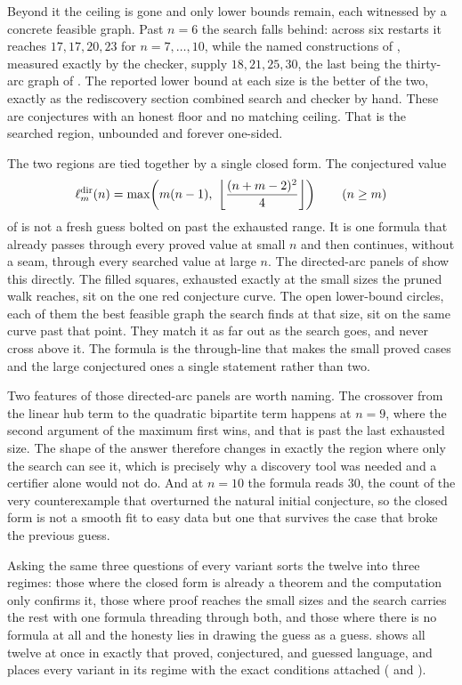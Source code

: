 Beyond it the ceiling is gone and only lower bounds remain, each witnessed by a concrete feasible graph. Past $n = 6$ the search falls behind: across six restarts it reaches $17, 17, 20, 23$ for $n = 7, \dots, 10$, while the named constructions of , measured exactly by the checker, supply $18, 21, 25, 30$, the last being the thirty-arc graph of . The reported lower bound at each size is the better of the two, exactly as the rediscovery section combined search and checker by hand. These are conjectures with an honest floor and no matching ceiling. That is the searched region, unbounded and forever one-sided.

The two regions are tied together by a single closed form. The conjectured value
\[
    \ell_m^{\mathrm{dir}}(n) = \max\!\left(m(n-1),\ \left\lfloor \frac{(n+m-2)^2}{4} \right\rfloor\right)
    \qquad (n \ge m)
\]
of  is not a fresh guess bolted on past the exhausted range. It is one formula that already passes through every proved value at small $n$ and then continues, without a seam, through every searched value at large $n$. The directed-arc panels of  show this directly. The filled squares, exhausted exactly at the small sizes the pruned walk reaches, sit on the one red conjecture curve. The open lower-bound circles, each of them the best feasible graph the search finds at that size, sit on the same curve past that point. They match it as far out as the search goes, and never cross above it. The formula is the through-line that makes the small proved cases and the large conjectured ones a single statement rather than two.

Two features of those directed-arc panels are worth naming. The crossover from the linear hub term to the quadratic bipartite term happens at $n = 9$, where the second argument of the maximum first wins, and that is past the last exhausted size. The shape of the answer therefore changes in exactly the region where only the search can see it, which is precisely why a discovery tool was needed and a certifier alone would not do. And at $n = 10$ the formula reads $30$, the count of the very counterexample that overturned the natural initial conjecture, so the closed form is not a smooth fit to easy data but one that survives the case that broke the previous guess.

Asking the same three questions of every variant sorts the twelve into three regimes: those where the closed form is already a theorem and the computation only confirms it, those where proof reaches the small sizes and the search carries the rest with one formula threading through both, and those where there is no formula at all and the honesty lies in drawing the guess as a guess.  shows all twelve at once in exactly that proved, conjectured, and guessed language, and  places every variant in its regime with the exact conditions attached ( and ).

